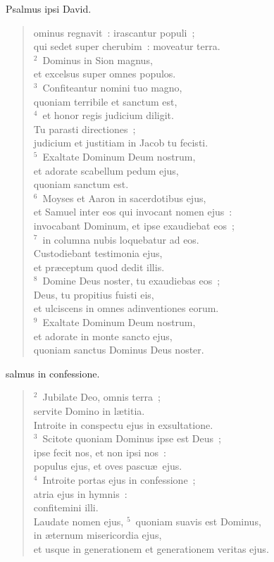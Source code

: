 \bchapter[Psalm]
Psalmus ipsi David. \begin{verse}ominus regnavit~: irascantur populi~;\\ qui sedet super cherubim~: moveatur terra.\\
${}^{2}$~Dominus in Sion magnus,\\ et excelsus super omnes populos.\\
${}^{3}$~Confiteantur nomini tuo magno,\\ quoniam terribile et sanctum est,\\
${}^{4}$~et honor regis judicium diligit.\\ Tu parasti directiones~;\\ judicium et justitiam in Jacob tu fecisti.\\
${}^{5}$~Exaltate Dominum Deum nostrum,\\ et adorate scabellum pedum ejus,\\ quoniam sanctum est.\\
${}^{6}$~Moyses et Aaron in sacerdotibus ejus,\\ et Samuel inter eos qui invocant nomen ejus~:\\ invocabant Dominum, et ipse exaudiebat eos~;\\
${}^{7}$~in columna nubis loquebatur ad eos.\\ Custodiebant testimonia ejus,\\ et pr\ae ceptum quod dedit illis.\\
${}^{8}$~Domine Deus noster, tu exaudiebas eos~;\\ Deus, tu propitius fuisti eis,\\ et ulciscens in omnes adinventiones eorum.\\
${}^{9}$~Exaltate Dominum Deum nostrum,\\ et adorate in monte sancto ejus,\\ quoniam sanctus Dominus Deus noster.\end{verse}



\bchapter[Psalm]
salmus in confessione.
\begin{verse}${}^{2}$~Jubilate Deo, omnis terra~;\\ servite Domino in l\ae titia.\\ Introite in conspectu ejus in exsultatione.\\
${}^{3}$~Scitote quoniam Dominus ipse est Deus~;\\ ipse fecit nos, et non ipsi nos~:\\ populus ejus, et oves pascu\ae\ ejus.\\
${}^{4}$~Introite portas ejus in confessione~;\\ atria ejus in hymnis~:\\ confitemini illi.\\ Laudate nomen ejus,
${}^{5}$~quoniam suavis est Dominus,\\ in \ae ternum misericordia ejus,\\ et usque in generationem et generationem veritas ejus.\end{verse}



